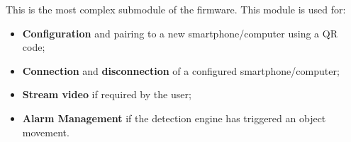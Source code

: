 \documentclass{article}
\begin{document}
This is the most complex submodule of the firmware. This module is used for:
\begin{itemize}
  \item \textbf{Configuration} and pairing to a new smartphone/computer using
    a QR code;
  \item \textbf{Connection} and \textbf{disconnection} of a configured
    smartphone/computer;
  \item \textbf{Stream video} if required by the user;
  \item \textbf{Alarm Management} if the detection engine has triggered an
    object movement.
\end{itemize}
\end{document}
